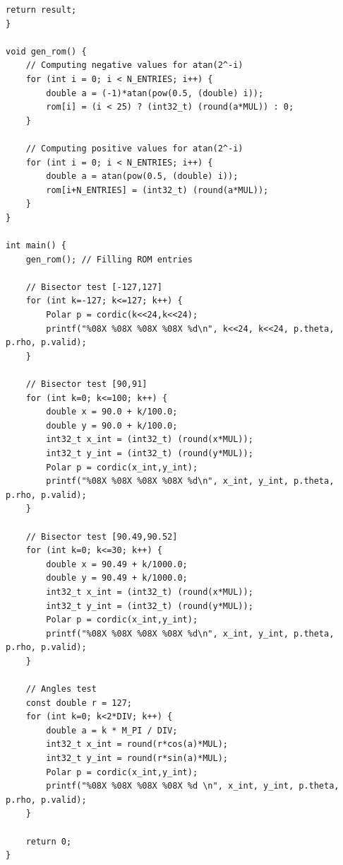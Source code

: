 \documentclass[12pt,a4paper]{report}
\begin{document}
\begin{lstlisting}[caption={Test-data generation}]
    return result;
}

void gen_rom() {
    // Computing negative values for atan(2^-i)
    for (int i = 0; i < N_ENTRIES; i++) {
        double a = (-1)*atan(pow(0.5, (double) i));
        rom[i] = (i < 25) ? (int32_t) (round(a*MUL)) : 0;
    }
    
    // Computing positive values for atan(2^-i)
    for (int i = 0; i < N_ENTRIES; i++) {
        double a = atan(pow(0.5, (double) i));
        rom[i+N_ENTRIES] = (int32_t) (round(a*MUL));
    }
}

int main() {
    gen_rom(); // Filling ROM entries
    
    // Bisector test [-127,127]
    for (int k=-127; k<=127; k++) {
        Polar p = cordic(k<<24,k<<24);
        printf("%08X %08X %08X %08X %d\n", k<<24, k<<24, p.theta, p.rho, p.valid);
    }
    
    // Bisector test [90,91]
    for (int k=0; k<=100; k++) {
        double x = 90.0 + k/100.0;
        double y = 90.0 + k/100.0;
        int32_t x_int = (int32_t) (round(x*MUL));
        int32_t y_int = (int32_t) (round(y*MUL));
        Polar p = cordic(x_int,y_int);     
        printf("%08X %08X %08X %08X %d\n", x_int, y_int, p.theta, p.rho, p.valid);
    }
    
    // Bisector test [90.49,90.52]
    for (int k=0; k<=30; k++) {
        double x = 90.49 + k/1000.0;
        double y = 90.49 + k/1000.0; 
        int32_t x_int = (int32_t) (round(x*MUL));
        int32_t y_int = (int32_t) (round(y*MUL));       
        Polar p = cordic(x_int,y_int);    
        printf("%08X %08X %08X %08X %d\n", x_int, y_int, p.theta, p.rho, p.valid);
    }
    
    // Angles test
    const double r = 127;
    for (int k=0; k<2*DIV; k++) {
        double a = k * M_PI / DIV;
        int32_t x_int = round(r*cos(a)*MUL);
        int32_t y_int = round(r*sin(a)*MUL);
        Polar p = cordic(x_int,y_int);
        printf("%08X %08X %08X %08X %d \n", x_int, y_int, p.theta, p.rho, p.valid);
    }
    
    return 0;
}

\end{lstlisting}
\end{document}
